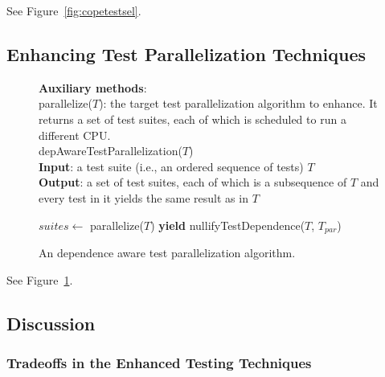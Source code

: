 See Figure~\ref{fig:copetestsel}.

\subsection{Enhancing Test Parallelization Techniques}

\begin{figure}[t!]
	\textbf{Auxiliary methods}: \\
    parallelize($\mathit{T}$): the target test parallelization algorithm to enhance.
    It returns a set of test suites, each of which is scheduled to run
    a different CPU.\\

    \vspace{-3mm}
	depAwareTestParallelization($\mathit{T}$)\\
	\textbf{Input}: a test suite (i.e., an ordered sequence of
    tests) $\mathit{T}$\\
	\textbf{Output}: a set of test suites, each of which 
    is a subsequence of $\mathit{T}$ and every test in it 
    yields the same result as in $\mathit{T}$\\
	 \begin{algorithmic}[1]
	 	\vspace{-5mm}
        \STATE $\mathit{suites} \leftarrow$ parallelize($\mathit{T}$)
        \STATE \textbf{yield} nullifyTestDependence($\mathit{T}$, $\mathit{T_{par}}$)
        \ENDFOR
	\end{algorithmic}
	\vspace{-3mm}
	\caption {
        An dependence aware test parallelization algorithm. 
	}
	\label{fig:copetestpar}
\end{figure}


%

See Figure~\ref{fig:copetestpar}.

\subsection{Discussion}

\subsubsection{Tradeoffs in the Enhanced Testing Techniques}

